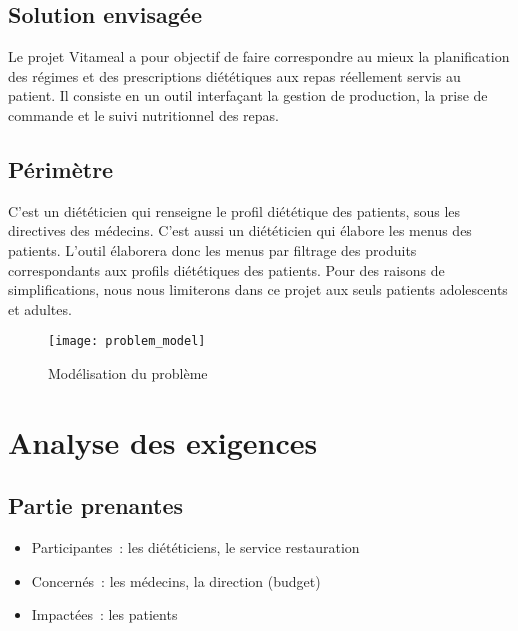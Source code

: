 \subsection{Solution envisagée}
Le projet Vitameal a pour objectif de faire correspondre au mieux la planification des régimes et des
prescriptions diététiques aux repas réellement servis au patient. Il consiste en un outil interfaçant la
gestion de production, la prise de commande et le suivi nutritionnel des repas.

\subsection{Périmètre}
C'est un diététicien qui renseigne le profil diététique des patients,
sous les directives des médecins. C'est aussi un diététicien qui élabore
les menus des patients. L'outil élaborera donc
les menus par filtrage des produits correspondants aux profils
diététiques des patients. Pour des raisons de simplifications, nous nous limiterons dans ce projet aux seuls patients adolescents et adultes.
\begin{figure}[H]
\label{Modelisation_du _probleme}
  \centering
      \texttt{[image: problem\_model]} %
\caption{Modélisation du problème}
\end{figure}

\section{Analyse des exigences}
\subsection{Partie prenantes}
\begin{itemize}
\item Participantes~: les diététiciens, le service restauration
\item Concernés~: les médecins, la direction (budget)
\item Impactées~: les patients
\end{itemize}

